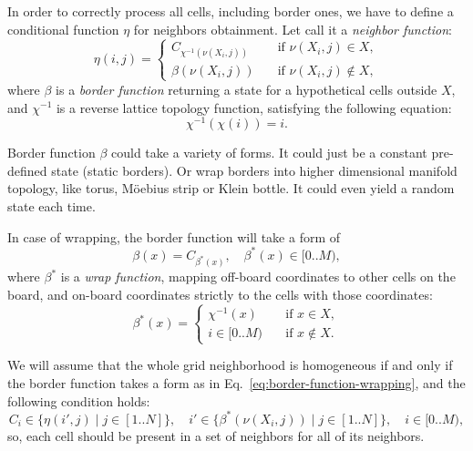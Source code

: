 \documentclass[a4paper,12pt,tikz,UTF8]{article}
\begin{document}
    In order to correctly process all cells, including border ones, we have to define a conditional function $\eta$ for neighbors obtainment. Let call it a \textit{neighbor function}:
    \begin{equation}
      \eta(i, j) = 
      \begin{cases}
        C_{\chi^{-1}(\nu(X_i, j))} & \quad \text{if } \nu(X_i, j) \in X,\\  
        \beta(\nu(X_i, j)) & \quad \text{if } \nu(X_i, j) \notin X,
      \end{cases}
    \end{equation}
    where $\beta$ is a \textit{border function} returning a state for a hypothetical cells outside $X$, and $\chi^{-1}$ is a reverse lattice topology function, satisfying the following equation:
    \begin{equation}
      \chi^{-1}(\chi(i)) = i.
    \end{equation}

    Border function $\beta$ could take a variety of forms. It could just be a constant pre-defined state (static borders). Or wrap borders into higher dimensional manifold topology, like torus, M{\"o}ebius strip or Klein bottle. It could even yield a random state each time.

    In case of wrapping, the border function will take a form of
    \begin{equation}
      \label{eq:border-function-wrapping}
      \beta(x) = C_{\beta^*(x)}, \quad \beta^*(x) \in {[0 .. M)},
    \end{equation}
    where $\beta^*$ is a \textit{wrap function}, mapping off-board coordinates to other cells on the board, and on-board coordinates strictly to the cells with those coordinates:
    \begin{equation}
      \beta^*(x) = 
      \begin{cases}
        \chi^{-1}(x) & \quad \text{if } x \in X,\\
        i \in {[0 .. M)} & \quad \text{if } x \notin X.
      \end{cases}
    \end{equation}

    We will assume that the whole grid neighborhood is homogeneous if and only if the border function takes a form as in Eq.~\ref{eq:border-function-wrapping}, and the following condition holds:
    \begin{equation}
      \label{eq:neighborhood-homogeneity}
      C_i \in \{ \eta(i', j) \mid j \in {[1 .. N]} \}, \quad i' \in \{ \beta^*(\nu(X_i, j)) \mid j \in {[1 .. N]} \}, \quad i \in {[0 .. M)},
    \end{equation}
    so, each cell should be present in a set of neighbors for all of its neighbors.
\end{document}
